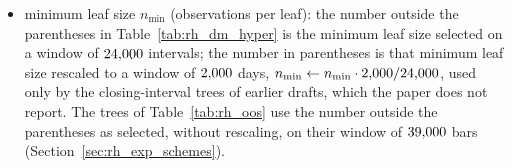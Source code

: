 \begin{itemize}
\begin{itemize}
  \item minimum leaf size $n_{\min}$ (observations per leaf): the number outside the parentheses in
    Table~\ref{tab:rh_dm_hyper} is the minimum leaf size selected on a window of $24{,}000$ intervals; the
    number in parentheses is that minimum leaf size rescaled to a window of $2{,}000$ days,
    $n_{\min} \leftarrow n_{\min} \cdot 2{,}000 / 24{,}000$, used only by the closing-interval trees of
    earlier drafts, which the paper does not report.
    The trees of Table~\ref{tab:rh_oos} use the number outside the parentheses as selected, without
    rescaling, on their window of $39{,}000$ bars (Section~\ref{sec:rh_exp_schemes}).

\end{itemize}
\end{itemize}

